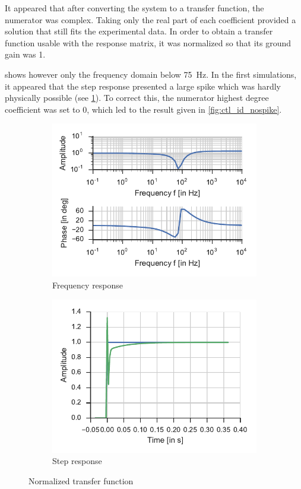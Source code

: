 It appeared that after converting the system to a transfer function, the numerator was complex. Taking only the real part of each coefficient provided a solution that still fits the experimental data. In order to obtain a transfer function usable with the response matrix, it was normalized so that its ground gain was 1.

 shows however only the frequency domain below \SI{75}{\hertz}. In the first simulations, it appeared that the step response presented a large spike which was hardly physically possible (see \cref{fig:ctl_id_spike}). To correct this, the numerator highest degree coefficient was set to 0, which led to the result given in \cref{fig:ctl_id_nospike}. 

\begin{figure}
	\begin{subfigure}[t]{0.5\linewidth}
		\includegraphics[width=1\linewidth]{img/ctl_id_3z}
		\caption{Frequency response}
	\end{subfigure}
	\hfill
	\begin{subfigure}[t]{0.5\linewidth}
		\includegraphics[width=1\linewidth]{img/ctl_id_3z_step}
		\caption{Step response}
	\end{subfigure}
	\caption{\label{fig:ctl_id_spike}Normalized transfer function}
\end{figure}

